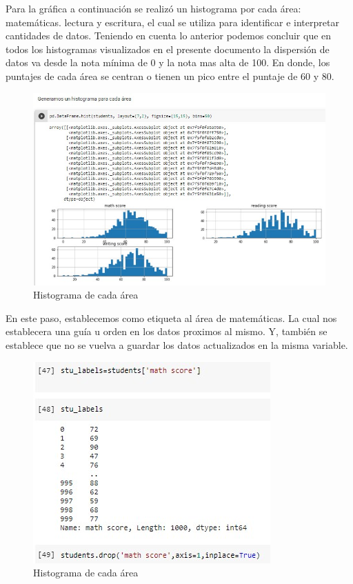 \documentclass[conference,compsoc,onecolumn]{IEEEtran}
\begin{document}
        Para la gráfica a continuación se realizó un histograma por cada área: matemáticas. lectura y escritura, el cual se utiliza para identificar e interpretar cantidades de datos. Teniendo en cuenta lo anterior podemos concluir que en todos los histogramas visualizados en el presente documento la dispersión de datos va desde la nota mínima de 0 y la nota mas alta de 100. En donde, los puntajes de cada área se centran o tienen un pico entre el puntaje de 60 y 80.
        
         \begin{figure}[H]       
            \centering
            \includegraphics[scale = 0.70]{his.jpg}
            \caption{Histograma de cada área}
            \label{subfigura16}
        \end{figure}
        
        En este paso, establecemos como etiqueta al área de matemáticas. La cual nos establecera una guía u orden en los datos proximos al mismo. Y, también se establece que no se vuelva a guardar los datos actualizados en la misma variable.
        
         \begin{figure}[H]       
            \centering
            \includegraphics[scale = 0.70]{ol.jpg}
            \caption{Histograma de cada área}
            \label{subfigura16}
        \end{figure}
        
\end{document}

